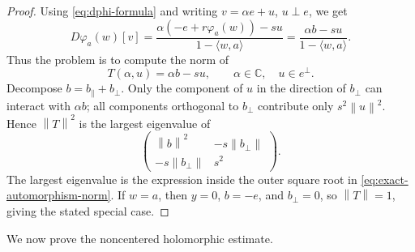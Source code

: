 \documentclass[11pt]{amsart}
\theoremstyle{definition}
\theoremstyle{remark}
\newcommand{\C}{\mathbb C}
\newcommand{\inner}[2]{\langle #1,#2\rangle}
\newcommand{\norm}[1]{\left\|#1\right\|}
\begin{document}
\begin{proof}
Using \eqref{eq:dphi-formula} and writing \(v=\alpha e+u\), \(u\perp e\), we get
\[
        D\varphi_a(w)[v]
        =
        \frac{\alpha(-e+r\varphi_a(w))-su}{1-\inner{w}{a}}
        =
        \frac{\alpha b-su}{1-\inner{w}{a}}.
\]
Thus the problem is to compute the norm of
\[
        T(\alpha,u)=\alpha b-su,
        \qquad \alpha\in\C,\quad u\in e^\perp.
\]
Decompose \(b=b_\parallel+b_\perp\). Only the component of \(u\) in the direction of \(b_\perp\) can interact with \(\alpha b\); all components orthogonal to \(b_\perp\) contribute only \(s^2\norm{u}^2\). Hence \(\norm{T}^2\) is the largest eigenvalue of
\[
        \begin{pmatrix}
        \norm{b}^2 & -s\norm{b_\perp}\\
        -s\norm{b_\perp} & s^2
        \end{pmatrix}.
\]
The largest eigenvalue is the expression inside the outer square root in \eqref{eq:exact-automorphism-norm}. If \(w=a\), then \(y=0\), \(b=-e\), and \(b_\perp=0\), so \(\norm{T}=1\), giving the stated special case.
\end{proof}

We now prove the noncentered holomorphic estimate.
\end{document}
